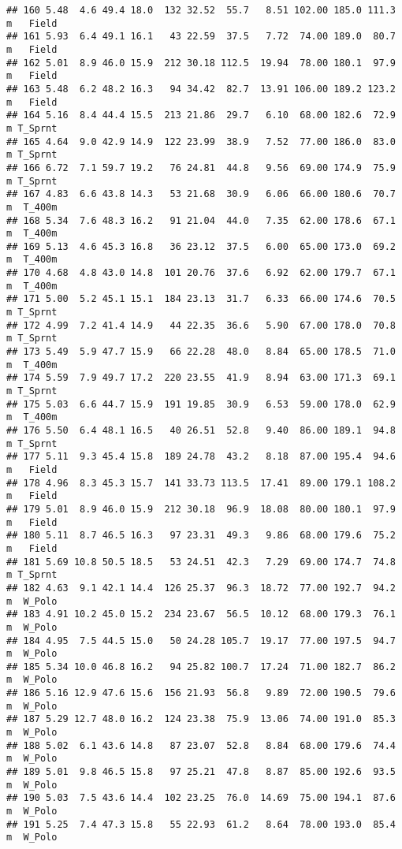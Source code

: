 \documentclass[
]{article}
\begin{document}
\begin{verbatim}
## 160 5.48  4.6 49.4 18.0  132 32.52  55.7   8.51 102.00 185.0 111.3   m   Field
## 161 5.93  6.4 49.1 16.1   43 22.59  37.5   7.72  74.00 189.0  80.7   m   Field
## 162 5.01  8.9 46.0 15.9  212 30.18 112.5  19.94  78.00 180.1  97.9   m   Field
## 163 5.48  6.2 48.2 16.3   94 34.42  82.7  13.91 106.00 189.2 123.2   m   Field
## 164 5.16  8.4 44.4 15.5  213 21.86  29.7   6.10  68.00 182.6  72.9   m T_Sprnt
## 165 4.64  9.0 42.9 14.9  122 23.99  38.9   7.52  77.00 186.0  83.0   m T_Sprnt
## 166 6.72  7.1 59.7 19.2   76 24.81  44.8   9.56  69.00 174.9  75.9   m T_Sprnt
## 167 4.83  6.6 43.8 14.3   53 21.68  30.9   6.06  66.00 180.6  70.7   m  T_400m
## 168 5.34  7.6 48.3 16.2   91 21.04  44.0   7.35  62.00 178.6  67.1   m  T_400m
## 169 5.13  4.6 45.3 16.8   36 23.12  37.5   6.00  65.00 173.0  69.2   m  T_400m
## 170 4.68  4.8 43.0 14.8  101 20.76  37.6   6.92  62.00 179.7  67.1   m  T_400m
## 171 5.00  5.2 45.1 15.1  184 23.13  31.7   6.33  66.00 174.6  70.5   m T_Sprnt
## 172 4.99  7.2 41.4 14.9   44 22.35  36.6   5.90  67.00 178.0  70.8   m T_Sprnt
## 173 5.49  5.9 47.7 15.9   66 22.28  48.0   8.84  65.00 178.5  71.0   m  T_400m
## 174 5.59  7.9 49.7 17.2  220 23.55  41.9   8.94  63.00 171.3  69.1   m T_Sprnt
## 175 5.03  6.6 44.7 15.9  191 19.85  30.9   6.53  59.00 178.0  62.9   m  T_400m
## 176 5.50  6.4 48.1 16.5   40 26.51  52.8   9.40  86.00 189.1  94.8   m T_Sprnt
## 177 5.11  9.3 45.4 15.8  189 24.78  43.2   8.18  87.00 195.4  94.6   m   Field
## 178 4.96  8.3 45.3 15.7  141 33.73 113.5  17.41  89.00 179.1 108.2   m   Field
## 179 5.01  8.9 46.0 15.9  212 30.18  96.9  18.08  80.00 180.1  97.9   m   Field
## 180 5.11  8.7 46.5 16.3   97 23.31  49.3   9.86  68.00 179.6  75.2   m   Field
## 181 5.69 10.8 50.5 18.5   53 24.51  42.3   7.29  69.00 174.7  74.8   m T_Sprnt
## 182 4.63  9.1 42.1 14.4  126 25.37  96.3  18.72  77.00 192.7  94.2   m  W_Polo
## 183 4.91 10.2 45.0 15.2  234 23.67  56.5  10.12  68.00 179.3  76.1   m  W_Polo
## 184 4.95  7.5 44.5 15.0   50 24.28 105.7  19.17  77.00 197.5  94.7   m  W_Polo
## 185 5.34 10.0 46.8 16.2   94 25.82 100.7  17.24  71.00 182.7  86.2   m  W_Polo
## 186 5.16 12.9 47.6 15.6  156 21.93  56.8   9.89  72.00 190.5  79.6   m  W_Polo
## 187 5.29 12.7 48.0 16.2  124 23.38  75.9  13.06  74.00 191.0  85.3   m  W_Polo
## 188 5.02  6.1 43.6 14.8   87 23.07  52.8   8.84  68.00 179.6  74.4   m  W_Polo
## 189 5.01  9.8 46.5 15.8   97 25.21  47.8   8.87  85.00 192.6  93.5   m  W_Polo
## 190 5.03  7.5 43.6 14.4  102 23.25  76.0  14.69  75.00 194.1  87.6   m  W_Polo
## 191 5.25  7.4 47.3 15.8   55 22.93  61.2   8.64  78.00 193.0  85.4   m  W_Polo

\end{verbatim}
\end{document}
